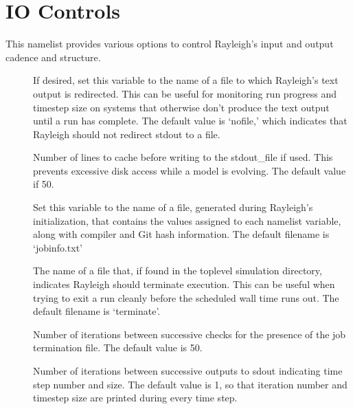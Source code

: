 \documentclass[letterpaper,11pt,english]{sphinxmanual}
\begin{document}
\section{IO Controls}
\label{\detokenize{doc/source/Namelist_Definitions/Namelist_Variables:io-controls}}
\sphinxAtStartPar
This namelist provides various options to control Rayleigh’s input and output cadence and structure.
\begin{description}
\item[{}] \leavevmode
\sphinxAtStartPar
If desired, set this variable to the name of a file to which Rayleigh’s text output is redirected.   This can be useful for monitoring run progress and time\sphinxhyphen{}step size on systems that otherwise don’t produce the text output until a run has complete.  The default value is ‘nofile,’ which indicates that Rayleigh should not redirect stdout to a file.

\item[{}] \leavevmode
\sphinxAtStartPar
Number of lines to cache before writing to the stdout\_file if used.  This prevents excessive disk access while a model is evolving.  The default value if 50.

\item[{}] \leavevmode
\sphinxAtStartPar
Set this variable to the name of a file, generated during Rayleigh’s initialization, that contains the values assigned to each namelist variable, along with compiler and Git hash information.  The default filename is ‘jobinfo.txt’

\item[{}] \leavevmode
\sphinxAtStartPar
The name of a file that, if found in the top\sphinxhyphen{}level simulation directory, indicates Rayleigh should terminate execution.  This can be useful when trying to exit a run cleanly before the scheduled wall time runs out.  The default filename is ‘terminate’.

\item[{}] \leavevmode
\sphinxAtStartPar
Number of iterations between successive checks for the presence of the job termination file.  The default value is 50.

\item[{}] \leavevmode
\sphinxAtStartPar
Number of iterations between successive outputs to sdout indicating time step number and size.  The default value is 1, so that iteration number and time\sphinxhyphen{}step size are printed during every time step.


\end{description}
\end{document}
